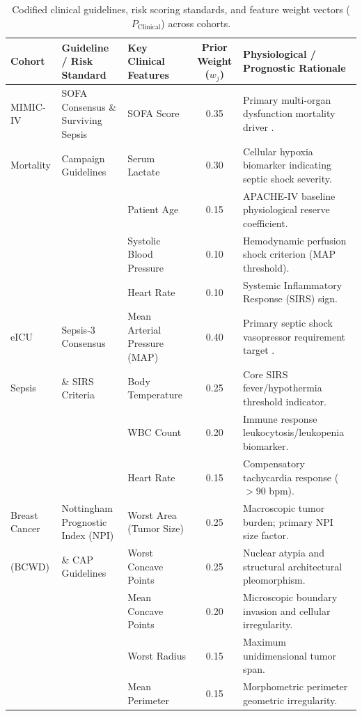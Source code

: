 \documentclass[3p,times,procedia]{elsarticle}
\theoremstyle{definition}
\begin{document}
\begin{table}[t]
\centering
\scriptsize
\caption{Codified clinical guidelines, risk scoring standards, and feature weight vectors ($P_{\mathrm{Clinical}}$) across cohorts.}
\label{tab:priors}
\begin{tabular}{lp{3.8cm}p{3.5cm}cp{5.2cm}}
\toprule
\textbf{Cohort} & \textbf{Guideline / Risk Standard} & \textbf{Key Clinical Features} & \textbf{Prior Weight ($w_j$)} & \textbf{Physiological / Prognostic Rationale} \\
\midrule
MIMIC-IV & SOFA Consensus \& Surviving Sepsis & SOFA Score & 0.35 & Primary multi-organ dysfunction mortality driver \cite{vincent1996sofa}. \\
Mortality & Campaign Guidelines \cite{singer2016third} & Serum Lactate & 0.30 & Cellular hypoxia biomarker indicating septic shock severity. \\
& & Patient Age & 0.15 & APACHE-IV baseline physiological reserve coefficient. \\
& & Systolic Blood Pressure & 0.10 & Hemodynamic perfusion shock criterion (MAP threshold). \\
& & Heart Rate & 0.10 & Systemic Inflammatory Response (SIRS) sign. \\
\midrule
eICU & Sepsis-3 Consensus & Mean Arterial Pressure (MAP) & 0.40 & Primary septic shock vasopressor requirement target \cite{singer2016third}. \\
Sepsis & \& SIRS Criteria \cite{singer2016third} & Body Temperature & 0.25 & Core SIRS fever/hypothermia threshold indicator. \\
& & WBC Count & 0.20 & Immune response leukocytosis/leukopenia biomarker. \\
& & Heart Rate & 0.15 & Compensatory tachycardia response ($>90$ bpm). \\
\midrule
Breast Cancer & Nottingham Prognostic Index (NPI) & Worst Area (Tumor Size) & 0.25 & Macroscopic tumor burden; primary NPI size factor. \\
(BCWD) & \& CAP Guidelines \cite{fitzgibbons2000cap} & Worst Concave Points & 0.25 & Nuclear atypia and structural architectural pleomorphism. \\
& & Mean Concave Points & 0.20 & Microscopic boundary invasion and cellular irregularity. \\
& & Worst Radius & 0.15 & Maximum unidimensional tumor span. \\
& & Mean Perimeter & 0.15 & Morphometric perimeter geometric irregularity. \\

\end{tabular}
\end{table}
\end{document}
